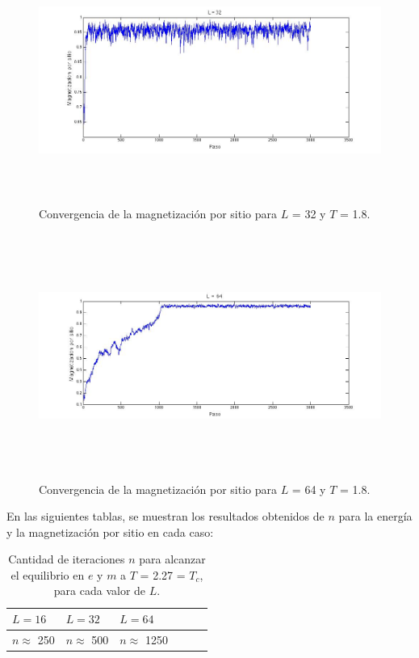 \documentclass[a4paper,12pt]{article}
\begin{document}
\begin{figure}[H]
\begin{center}
\includegraphics[height=8cm]{../graficos/Mag_L32_T18.jpg}
\caption[width=5cm]{Convergencia de la magnetizaci\'on por sitio para $L$ = 32 y $T$ = 1.8.}
\end{center}
\end{figure}

\begin{figure}[H]
\begin{center}
\includegraphics[height=8cm,width=20cm]{../graficos/Mag_L64_T18.jpg}
\caption[width=5cm]{Convergencia de la magnetizaci\'on por sitio para $L$ = 64 y $T$ = 1.8.}
\end{center}
\end{figure}


En las siguientes tablas, se muestran los resultados obtenidos de $n$ para la energ\'ia y la magnetizaci\'on por sitio en cada caso:

\begin{table}
	\centering
    \begin{tabular}{ | l | l | l | l | l |p{5cm} |}
    \hline
    $L = 16$ & $L = 32$ & $L = 64$\\ \hline
    $n \approx$ 250 & $n \approx$ 500 & $n \approx$ 1250  \\ \hline
        
    \end{tabular}
    \caption{Cantidad de iteraciones $n$ para alcanzar el equilibrio en $e$ y $m$ a $T$ = 2.27 = $T_{c}$, para cada valor de $L$.}
    \label{table:1}
\end{table}
\end{document}
